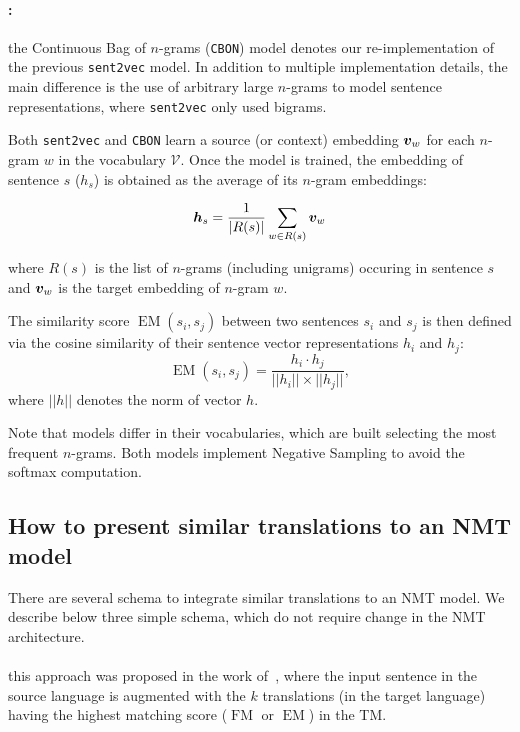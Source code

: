 \paragraph{:} the Continuous Bag of $n$-grams (\texttt{CBON}) 
 model denotes our re-implementation of the previous \texttt{sent2vec} model. In addition to multiple implementation details, the main difference is the use of arbitrary large $n$-grams to model sentence representations, where \texttt{sent2vec} only used bigrams.

\vspace{0.1cm}

Both \texttt{sent2vec} and \texttt{CBON} learn a source (or context) embedding $\boldsymbol{v}_w$ for each $n$-gram $w$ in the vocabulary $\mathcal{V}$.
Once the model is trained, the embedding of sentence $s$ ($h_s$) is obtained as the average of its $n$-gram embeddings:

\begin{equation*}
    \boldsymbol{h}_s = \frac{1}{|R(s)|} \sum_{w\in R(s)} \boldsymbol{v}_w
\end{equation*}

\noindent where $R(s)$ is the list of $n$-grams (including unigrams) occuring in sentence $s$ and $\boldsymbol{v}_w$ is the target embedding of $n$-gram $w$.

The similarity score $\operatorname{EM} (s_i,s_j)$ between two sentences $s_i$ and $s_j$ is then defined via the cosine similarity of their sentence vector representations $h_i$ and $h_j$:
\begin{equation*}
\operatorname{EM} (s_i, s_j) = \frac{h_i \cdot h_j}{||h_i|| \times ||h_j||},
\label{eq:EM-chap8}
\end{equation*}
\noindent where $||h||$ denotes the norm of vector $h$.

Note that models differ in their vocabularies, which are built selecting the most frequent $n$-grams.
Both models implement Negative Sampling to avoid the softmax computation. 

\subsection{How to present similar translations to an NMT model}
\label{ssec:schemes-chap8}
There are several schema to integrate similar translations to an NMT model. We describe below three simple schema, which do not require change in the NMT architecture.

\paragraph{} this approach was proposed in the work of~\citet{bulte19neural},
where the input sentence in the source language is augmented with the $k$ translations (in the target language) having the highest matching score ($\operatorname{FM}$ or $\operatorname{EM}$) in the TM. 

